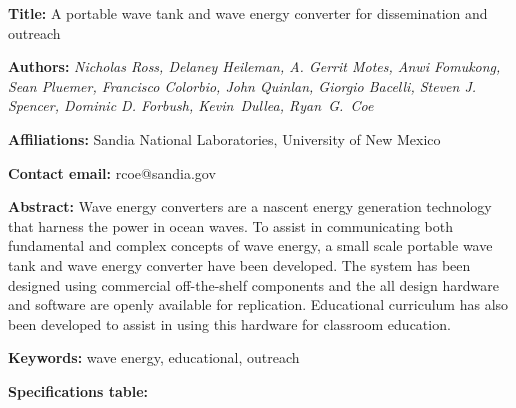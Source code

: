 \documentclass[11pt, letterpaper]{article}
\begin{document}
\begin{flushleft}


\setlength{\parindent}{0pt}
\setlength{\parskip}{10pt}

\textbf{Title:} A portable wave tank and wave energy converter for dissemination and outreach

\textbf{Authors:} \textit{Nicholas Ross, Delaney Heileman, A. Gerrit Motes, Anwi Fomukong, Sean Pluemer, Francisco Colorbio, John Quinlan, Giorgio Bacelli, Steven J. Spencer, Dominic D. Forbush, Kevin~Dullea, Ryan~G.~Coe}

\textbf{Affiliations:} Sandia National Laboratories, University of New Mexico

\textbf{Contact email:} rcoe@sandia.gov

\textbf{Abstract:} Wave energy converters are a nascent energy generation technology that harness the power in ocean waves.
To assist in communicating both fundamental and complex concepts of wave energy, a small scale portable wave tank and wave energy converter have been developed.
The system has been designed using commercial off-the-shelf components and the all design hardware and software are openly available for replication.
Educational curriculum has also been developed to assist in using this hardware for classroom education.

\textbf{Keywords:} wave energy, educational, outreach

\textbf{Specifications table:}


\end{flushleft}
\end{document}
